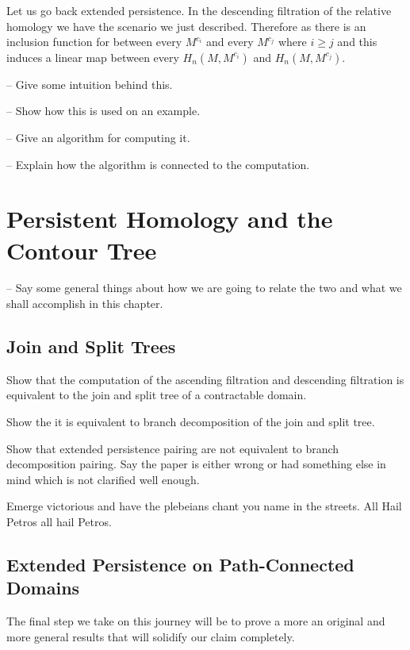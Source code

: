 
Let us go back extended persistence. In the descending filtration of the relative homology we have the scenario we just described. Therefore as there is an inclusion function for between every $M^{c_i}$ and every $M^{c_j}$ where $i \ge j$ and this induces a linear map between every $H_n(M, M^{c_i})$ and $H_n(M, M^{c_j})$.


-- Give some intuition behind this.

-- Show how this is used on an example.

-- Give an algorithm for computing it.

-- Explain how the algorithm is connected to the computation.

\section{Persistent Homology and the Contour Tree}

-- Say some general things about how we are going to relate the two and what we shall accomplish in this chapter.

\subsection{Join and Split Trees}

Show that the computation of the ascending filtration and descending filtration is equivalent to the join and split tree of a contractable domain.

Show the it is equivalent to branch decomposition of the join and split tree.

Show that extended persistence pairing are not equivalent to branch decomposition pairing. Say the paper is either wrong or had something else in mind which is not clarified well enough.

Emerge victorious and have the plebeians chant you name in the streets. All Hail Petros all hail Petros.


\subsection{Extended Persistence on Path-Connected Domains}

The final step we take on this journey will be to prove a more an original and more general results that will solidify our claim completely.



